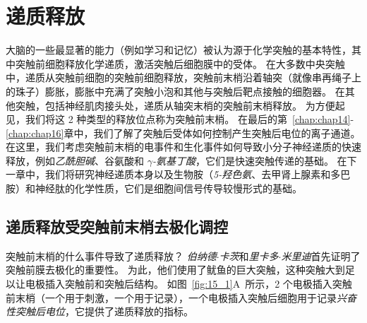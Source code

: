 \chapter{递质释放} \label{chap:chap15}

大脑的一些最显著的能力（例如学习和记忆）被认为源于化学突触的基本特性，其中突触前细胞释放化学递质，激活突触后细胞膜中的受体。
在大多数中央突触中，递质从突触前细胞的突触前细胞释放，突触前末梢沿着轴突（就像串再绳子上的珠子）膨胀，膨胀中充满了突触小泡和其他与突触后靶点接触的细胞器。
在其他突触，包括神经肌肉接头处，递质从轴突末梢的突触前末梢释放。
为方便起见，我们将这 2 种类型的释放位点称为突触前末梢。
在最后的第~\ref{chap:chap14}-\ref{chap:chap16}章中，我们了解了突触后受体如何控制产生突触后电位的离子通道。
在这里，我们考虑突触前末梢的电事件和生化事件如何导致小分子神经递质的快速释放，例如\textit{乙酰胆碱}、谷氨酸和 \textit{$\gamma$-氨基丁酸}，它们是快速突触传递的基础。
在下一章中，我们将研究神经递质本身以及生物胺（\textit{5-羟色氨}、去甲肾上腺素和多巴胺）和神经肽的化学性质，它们是细胞间信号传导较慢形式的基础。



\section{递质释放受突触前末梢去极化调控}

突触前末梢的什么事件导致了递质释放？
\textit{伯纳德$\cdot$卡茨}和\textit{里卡多$\cdot$米里迪}首先证明了突触前膜去极化的重要性。
为此，他们使用了鱿鱼的巨大突触，这种突触大到足以让电极插入突触前和突触后结构。
如图~\ref{fig:15_1}A~所示，2 个电极插入突触前末梢（一个用于刺激，一个用于记录），一个电极插入突触后细胞用于记录\textit{兴奋性突触后电位}，它提供了递质释放的指标。


